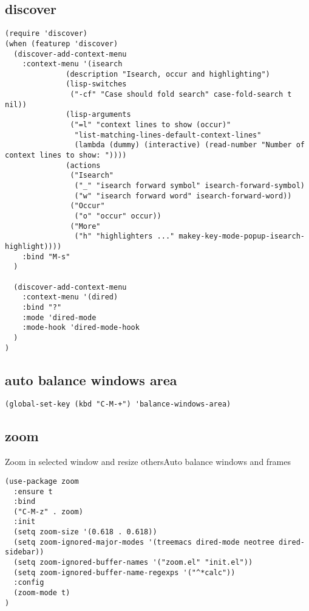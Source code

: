 \documentclass[11pt]{article}
\begin{document}
\subsection*{discover}
\label{sec:org25b119e}

\begin{verbatim}
(require 'discover)
(when (featurep 'discover)
  (discover-add-context-menu
    :context-menu '(isearch
              (description "Isearch, occur and highlighting")
              (lisp-switches
               ("-cf" "Case should fold search" case-fold-search t nil))
              (lisp-arguments
               ("=l" "context lines to show (occur)"
                "list-matching-lines-default-context-lines"
                (lambda (dummy) (interactive) (read-number "Number of context lines to show: "))))
              (actions
               ("Isearch"
                ("_" "isearch forward symbol" isearch-forward-symbol)
                ("w" "isearch forward word" isearch-forward-word))
               ("Occur"
                ("o" "occur" occur))
               ("More"
                ("h" "highlighters ..." makey-key-mode-popup-isearch-highlight))))
    :bind "M-s"
  )

  (discover-add-context-menu
    :context-menu '(dired)
    :bind "?"
    :mode 'dired-mode
    :mode-hook 'dired-mode-hook
  )
)
\end{verbatim}

\subsection*{auto balance windows area}
\label{sec:org0e282ce}

\begin{verbatim}
(global-set-key (kbd "C-M-+") 'balance-windows-area)
\end{verbatim}

\subsection*{zoom}
\label{sec:orgd1e3d19}

Zoom in selected window and resize othersAuto balance windows and frames

\begin{verbatim}
(use-package zoom
  :ensure t
  :bind
  ("C-M-z" . zoom)
  :init
  (setq zoom-size '(0.618 . 0.618))
  (setq zoom-ignored-major-modes '(treemacs dired-mode neotree dired-sidebar))
  (setq zoom-ignored-buffer-names '("zoom.el" "init.el"))
  (setq zoom-ignored-buffer-name-regexps '("^*calc"))
  :config
  (zoom-mode t)
)
\end{verbatim}
\end{document}
